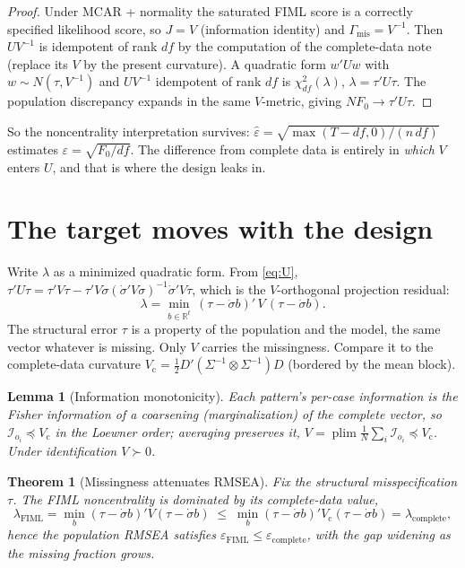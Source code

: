 \documentclass[11pt]{article}
\newcommand{\plim}{\operatorname*{plim}}
\newcommand{\Gmis}{\Gamma_{\mathrm{mis}}}
\newcommand{\rmsea}{\widehat{\varepsilon}}
\theoremstyle{plain}
\newtheorem{theorem}{Theorem}
\newtheorem{lemma}{Lemma}
\theoremstyle{remark}
\begin{document}
\begin{proof}
Under MCAR + normality the saturated FIML score is a correctly specified
likelihood score, so $J=V$ (information identity) and $\Gmis=V^{-1}$. Then
$UV^{-1}$ is idempotent of rank $df$ by the computation of the complete-data note
(replace its $V$ by the present curvature). A quadratic form $w'Uw$ with
$w\sim N(\tau,V^{-1})$ and $UV^{-1}$ idempotent of rank $df$ is
$\chi^2_{df}(\lambda)$, $\lambda=\tau'U\tau$. The population discrepancy expands
in the same $V$-metric, giving $NF_0\to\tau'U\tau$.
\end{proof}

So the noncentrality interpretation survives: $\rmsea=\sqrt{\max(T-df,0)/(n\,df)}$
estimates $\varepsilon=\sqrt{F_0/df}$. The difference from complete data is
entirely in \emph{which} $V$ enters $U$, and that is where the design leaks in.

\section{The target moves with the design}

Write $\lambda$ as a minimized quadratic form. From \eqref{eq:U},
$\tau'U\tau=\tau'V\tau-\tau'V\dot\sigma(\dot\sigma'V\dot\sigma)^{-1}\dot\sigma'V\tau$,
which is the $V$-orthogonal projection residual:
\begin{equation}\label{eq:lammin}
  \lambda = \min_{b\in\mathbb{R}^t}\,(\tau-\dot\sigma b)'\,V\,(\tau-\dot\sigma b).
\end{equation}
The structural error $\tau$ is a property of the population and the model, the
same vector whatever is missing. Only $V$ carries the missingness. Compare it to
the complete-data curvature $V_{\mathrm c}=\tfrac12 D'(\Sigma^{-1}\otimes\Sigma^{-1})D$
(bordered by the mean block).

\begin{lemma}[Information monotonicity]\label{lem:mono}
Each pattern's per-case information is the Fisher information of a coarsening
(marginalization) of the complete vector, so $\mathcal I_{o_i}\preceq V_{\mathrm c}$
in the Loewner order; averaging preserves it, $V=\plim\tfrac1N\sum_i\mathcal
I_{o_i}\preceq V_{\mathrm c}$. Under identification $V\succ0$.
\end{lemma}

\begin{theorem}[Missingness attenuates RMSEA]\label{thm:atten}
Fix the structural misspecification $\tau$. The FIML noncentrality is dominated
by its complete-data value,
\[
  \lambda_{\mathrm{FIML}} = \min_b(\tau-\dot\sigma b)'V(\tau-\dot\sigma b)
  \;\le\;
  \min_b(\tau-\dot\sigma b)'V_{\mathrm c}(\tau-\dot\sigma b)
  = \lambda_{\mathrm{complete}},
\]
hence the population RMSEA satisfies
$\varepsilon_{\mathrm{FIML}}\le\varepsilon_{\mathrm{complete}}$, with the gap
widening as the missing fraction grows.
\end{theorem}
\end{document}
